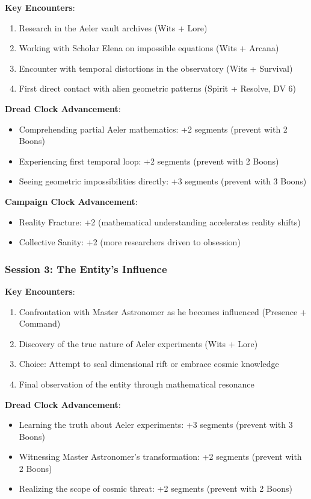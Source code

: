 \documentclass[11pt]{article}
\begin{document}
\textbf{Key Encounters}:
\begin{enumerate}[leftmargin=*]
\item Research in the Aeler vault archives (Wits + Lore)
\item Working with Scholar Elena on impossible equations (Wits + Arcana)
\item Encounter with temporal distortions in the observatory (Wits + Survival)
\item First direct contact with alien geometric patterns (Spirit + Resolve, DV 6)
\end{enumerate}

\textbf{Dread Clock Advancement}:
\begin{itemize}[leftmargin=*]
\item Comprehending partial Aeler mathematics: +2 segments (prevent with 2 Boons)
\item Experiencing first temporal loop: +2 segments (prevent with 2 Boons)
\item Seeing geometric impossibilities directly: +3 segments (prevent with 3 Boons)
\end{itemize}

\textbf{Campaign Clock Advancement}:
\begin{itemize}[leftmargin=*]
\item Reality Fracture: +2 (mathematical understanding accelerates reality shifts)
\item Collective Sanity: +2 (more researchers driven to obsession)
\end{itemize}

\subsubsection*{Session 3: The Entity's Influence}

\textbf{Key Encounters}:
\begin{enumerate}[leftmargin=*]
\item Confrontation with Master Astronomer as he becomes influenced (Presence + Command)
\item Discovery of the true nature of Aeler experiments (Wits + Lore)
\item Choice: Attempt to seal dimensional rift or embrace cosmic knowledge
\item Final observation of the entity through mathematical resonance
\end{enumerate}

\textbf{Dread Clock Advancement}:
\begin{itemize}[leftmargin=*]
\item Learning the truth about Aeler experiments: +3 segments (prevent with 3 Boons)
\item Witnessing Master Astronomer's transformation: +2 segments (prevent with 2 Boons)
\item Realizing the scope of cosmic threat: +2 segments (prevent with 2 Boons)
\end{itemize}
\end{document}
